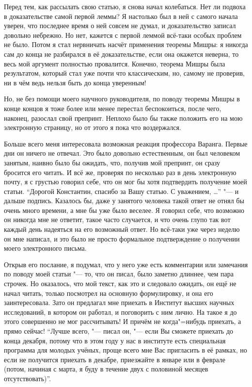 Перед тем, как рассылать свою статью, я снова начал колебаться.
Нет ли подвоха в доказательстве самой первой леммы?
Я настолько был в ней с самого начала уверен, что последнее время о ней совсем
не думал, и доказательство записал довольно небрежно.
Но нет, кажется с первой леммой всё-таки особых проблем не было.
Потом я стал нервничать насчёт применения теоремы Мишры:
я никогда сам до конца не разбирался в её доказательстве, если она окажется
неверна, то весь мой аргумент полностью провалится.
Конечно, теорема Мишры была результатом, который стал уже почти что классическим,
но, самому не проверив, ни в чём ведь нельзя быть до конца уверенным!

Но, не без помощи моего научного руководителя, по поводу теоремы Мишры в конце
концов я тоже более или менее перестал беспокоиться, после чего, наконец,
разослал свой препринт.
Неплохо было бы также положить его на мою электронную страницу, но от этого я
пока что воздержался.

Больше всего меня интересовала возможная реакция профессора Варанга.
Первые дни он ничего не отвечал.
Это было довольно естественным, он был человеком занятым, наивно было бы ожидать,
что, получив мой препринт, он сразу бросится его читать.
И всё же, проверяя по несколько раз в день электронную почту, я с грустью
говорил себе, что он мог бы хотя подтвердить получение моей статьи.
\enquote{Дорогой Константин, спасибо за Вашу статью.
С уважением, \ldots} "--- и дальше подпись.
Казалось бы, даже у занятого человека такой ответ не отнял бы очень много
времени, а мне бы уже было веселее.
Я говорил себе, что возможно он никогда мне не ответит, такое часто случается,
и что очень глупо так вот каждый день надеяться на его возможный ответ.
Но всё-таки уже через неделю он мне написал, и это было не просто формальное
подтверждение о получении моего электронного письма.

Открыв его послание, я подумал, что у него уже есть комментарии или замечания по
поводу моей статьи "--- то, что он писал, было заметно длиннее, чем пара
строчек.
Но оказалось, что мой текст, как это и следовало ожидать, он ещё не начал читать,
только посмотрел на основную формулировку, и она его заинтересовала.
Зато он предлагал мне приехать в Институт высших научных исследований, в котором
он работал, и поговорить с ним лично.
На такое я до этого совершенно не мог рассчитывать!
И причём не когда"=нибудь приехать, а прямо сейчас!
\enquote{Лучше всего, "--- писал он, "--- если Вы сможете приехать до конца
декабря, потому что в этом году у нас в институте есть специальная программа для
молодых учёных, проще всего мне Вас пригласить в её рамках, но если не получится
приехать в декабре, приезжайте в январе или в феврале (потом, начиная с марта,
я буду в течение двух с половиной месяцев отсутствовать)}.

